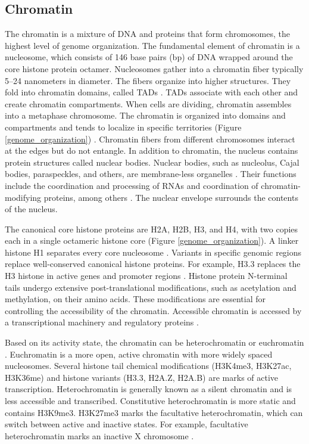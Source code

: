     \subsection{Chromatin}

    The chromatin is a mixture of DNA and proteins that form chromosomes, the highest level of genome organization. The fundamental element of chromatin is a nucleosome, which consists of 146 base pairs (bp) of DNA wrapped around the core histone protein octamer. Nucleosomes gather into a chromatin fiber typically 5--24 nanometers in diameter. The fibers organize into higher structures. They fold into chromatin domains, called \ac{TADs} \cite{luppino2020cohesin}. TADs associate with each other and create chromatin compartments. When cells are dividing, chromatin assembles into a metaphase chromosome. The chromatin is organized into domains and compartments and tends to localize in specific territories ({Figure \ref{genome_organization}}) \cite{misteli2020self,morrison2021molecular}. Chromatin fibers from different chromosomes interact at the edges but do not entangle. In addition to chromatin, the nucleus contains protein structures called nuclear bodies. Nuclear bodies, such as nucleolus, Cajal bodies, paraspeckles, and others, are membrane-less organelles \cite{mao2011biogenesis}. Their functions include the coordination and processing of RNAs and coordination of chromatin-modifying proteins, among others \cite{mao2011biogenesis}. The nuclear envelope surrounds the contents of the nucleus.

    The canonical core histone proteins are H2A, H2B, H3, and H4, with two copies each in a single octameric histone core ({Figure \ref{genome_organization}}). A linker histone H1 separates every core nucleosome \cite{marino2005histone,morrison2021molecular}. Variants in specific genomic regions replace well-conserved canonical histone proteins. For example, H3.3 replaces the H3 histone in active genes and promoter regions \cite{marino2005histone, talbert2021histone}. Histone protein N-terminal tails undergo extensive post-translational modifications, such as acetylation and methylation, on their amino acids. These modifications are essential for controlling the accessibility of the chromatin. Accessible chromatin is accessed by a transcriptional machinery and regulatory proteins \cite{marino2005histone}.

    Based on its activity state, the chromatin can be heterochromatin or euchromatin \cite{karpinska2023role}. Euchromatin is a more open, active chromatin with more widely spaced nucleosomes. Several histone tail chemical modifications (\ac{H3K4me3}, \ac{H3K27ac}, \ac{H3K36me}) and histone variants (H3.3, H2A.Z, H2A.B) are marks of active transcription. Heterochromatin is generally known as a silent chromatin and is less accessible and transcribed. Constitutive heterochromatin is more static and contains \ac{H3K9me3}. \ac{H3K27me3} marks the facultative heterochromatin, which can switch between active and inactive states. For example, facultative heterochromatin marks an inactive X chromosome \cite{morrison2021molecular}.

